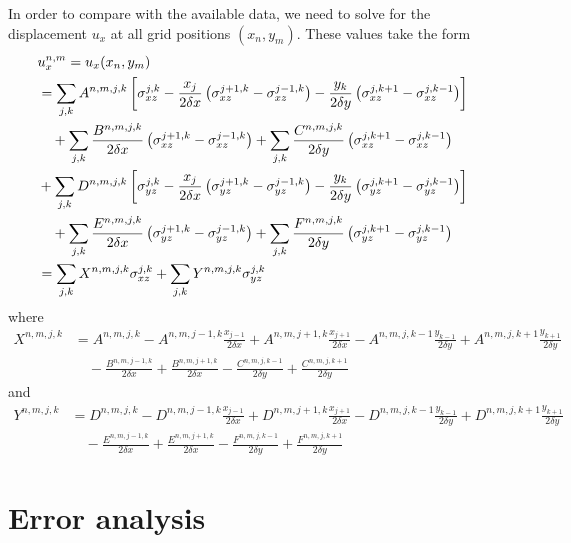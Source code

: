 \documentclass{article}
\begin{document}
In order to compare with the available data, we need to solve for the displacement $u_x$ at all grid positions $(x_n,y_m)$. These values take the form
\begin{align}
\lefteqn{u_x^{n,m} = u_x(x_n,y_m) }\nonumber\\
 &= \sum_{j,k} A^{n,m,j,k}\left[ \sigma_{xz}^{j,k} - \frac{x_j}{2\delta x} \left(\sigma_{xz}^{j+1,k}  -  \sigma_{xz}^{j-1,k} \right) -\frac{y_k}{2\delta y}\left( \sigma_{xz}^{j,k+1}- \sigma_{xz}^{j,k-1} \right) \right] \nonumber\\
 &\quad + \sum_{j,k} \frac{B^{n,m,j,k}}{2\delta x} \left(\sigma_{xz}^{j+1,k}  - \sigma_{xz}^{j-1,k} \right) + \sum_{j,k} \frac{C^{n,m,j,k}}{2\delta y}\left( \sigma_{xz}^{j,k+1} -  \sigma_{xz}^{j,k-1} \right)\nonumber\\
  &+ \sum_{j,k} D^{n,m,j,k}\left[ \sigma_{yz}^{j,k} - \frac{x_j}{2\delta x} \left(\sigma_{yz}^{j+1,k}  -  \sigma_{yz}^{j-1,k} \right) -\frac{y_k}{2\delta y}\left( \sigma_{yz}^{j,k+1}- \sigma_{yz}^{j,k-1} \right) \right] \nonumber\\
 &\quad + \sum_{j,k} \frac{E^{n,m,j,k}}{2\delta x} \left(\sigma_{yz}^{j+1,k}  -   \sigma_{yz}^{j-1,k} \right) + \sum_{j,k} \frac{F^{n,m,j,k}}{2\delta y}\left( \sigma_{yz}^{j,k+1} -   \sigma_{yz}^{j,k-1} \right)\nonumber\\
 &= \sum_{j,k} X^{n,m,j,k} \sigma_{xz}^{j,k} +  \sum_{j,k}Y^{n,m,j,k} \sigma_{yz}^{j,k} 
\end{align}
where 
\begin{align}
X^{n,m,j,k} &= A^{n,m,j,k} - A^{n,m,j-1,k}\frac{x_{j-1}}{2\delta x} +A^{n,m,j+1,k}\frac{x_{j+1}}{2\delta x} - A^{n,m,j,k-1}\frac{y_{k-1}}{2\delta y} +A^{n,m,j,k+1}\frac{y_{k+1}}{2\delta y} \nonumber\\
&\quad-\frac{B^{n,m,j-1,k}}{2\delta x} +\frac{B^{n,m,j+1,k}}{2\delta x} - \frac{C^{n,m,j,k-1}}{2\delta y} +\frac{C^{n,m,j,k+1}}{2\delta y}
\end{align}
and
\begin{align}
Y^{n,m,j,k} &= D^{n,m,j,k} - D^{n,m,j-1,k}\frac{x_{j-1}}{2\delta x} +D^{n,m,j+1,k}\frac{x_{j+1}}{2\delta x} - D^{n,m,j,k-1}\frac{y_{k-1}}{2\delta y} +D^{n,m,j,k+1}\frac{y_{k+1}}{2\delta y} \nonumber\\
&\quad-\frac{E^{n,m,j-1,k}}{2\delta x} +\frac{E^{n,m,j+1,k}}{2\delta x} - \frac{F^{n,m,j,k-1}}{2\delta y} +\frac{F^{n,m,j,k+1}}{2\delta y}
\end{align}

\section{Error analysis}
\end{document}
